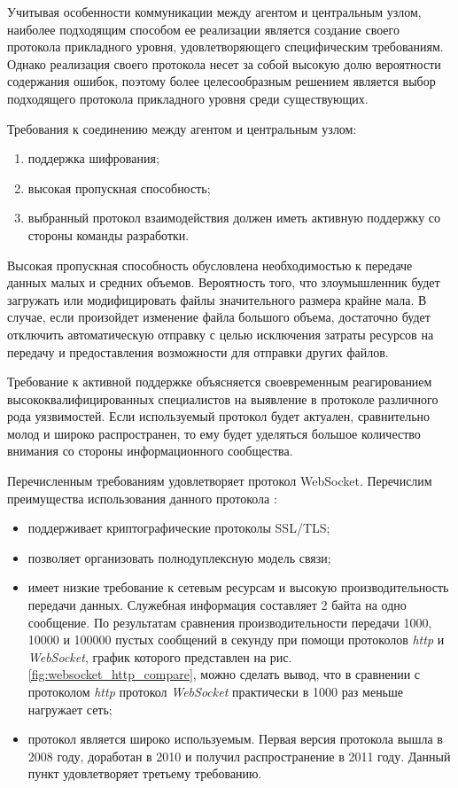 Учитывая особенности коммуникации между агентом и центральным узлом, наиболее подходящим способом ее реализации является создание своего протокола прикладного уровня, удовлетворяющего специфическим требованиям. Однако реализация своего протокола несет за собой высокую долю вероятности содержания ошибок, поэтому более целесообразным  решением является выбор подходящего протокола прикладного уровня среди существующих.

Требования к соединению между агентом и центральным узлом:
\begin{enumerate}
\item поддержка шифрования;
\item высокая пропускная способность;
\item выбранный протокол взаимодействия должен иметь активную поддержку со стороны команды разработки.
\end{enumerate}

Высокая пропускная способность обусловлена необходимостью к передаче данных малых и средних объемов. Вероятность того, что злоумышленник будет загружать или модифицировать файлы значительного размера крайне мала. В случае, если произойдет изменение файла большого объема, достаточно будет отключить автоматическую отправку с целью исключения затраты ресурсов на передачу и предоставления возможности для отправки других файлов.

Требование к активной поддержке объясняется своевременным реагированием высококвалифицированных специалистов на выявление в протоколе различного рода уязвимостей. Если используемый протокол будет актуален, сравнительно молод и широко распространен, то ему будет уделяться большое количество внимания со стороны информационного сообщества.

Перечисленным требованиям удовлетворяет протокол WebSocket. Перечислим преимущества использования данного протокола \citep{Fedorenkov2015WebSocket}:
\begin{itemize}
\item поддерживает криптографические протоколы SSL/TLS;
\item позволяет организовать полнодуплексную модель связи;
\item имеет низкие требование к сетевым ресурсам и высокую производительность передачи данных. Служебная информация составляет 2 байта на одно сообщение. По результатам сравнения\citep{Fedorenkov2015WebSocket} производительности передачи 1000, 10000 и 100000 пустых сообщений в секунду при помощи протоколов \textit{http} и \textit{WebSocket}, график которого представлен на рис. \ref{fig:websocket_http_compare}, можно сделать вывод, что в сравнении с протоколом \textit{http} протокол \textit{WebSocket} практически в 1000 раз меньше нагружает сеть;
\item протокол является широко используемым. Первая версия протокола вышла в 2008 году, доработан в 2010 и получил распространение в 2011 году. Данный пункт удовлетворяет третьему требованию.
\end{itemize}

